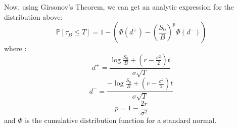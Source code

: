 Now, using Girsonov's Theorem, we can get an analytic expression for the 
distribution above:
\begin{equation}
	\mathbb{P}[\tau_B \leq T] = 1 - \left( \Phi(d^+) - \left( \frac{S_0}{B}
	\right)^p \Phi(d^-) \right)
\end{equation}
where :
\begin{equation*}
	d^+ = \frac{ \log \frac{S_0}{B} + (r - \frac{\sigma^2}{2}) t }{\sigma \sqrt{T}}
\end{equation*}
\begin{equation*}
	d^- = \frac{ - \log \frac{S_0}{B} + (r - \frac{\sigma^2}{2}) t }{\sigma \sqrt{T}}
\end{equation*}
\begin{equation*}
	p =  1 - \frac{2r}{\sigma^2}
\end{equation*}
and $\Phi$ is the cumulative distribution function for a standard normal.

